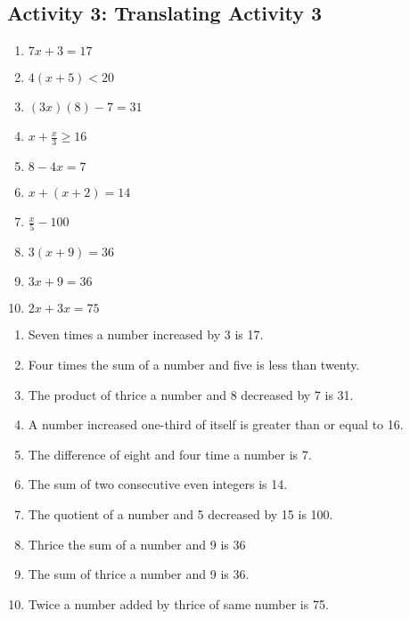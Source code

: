 \subsection*{Activity 3: Translating Activity 3}
\begin{enumerate}
\item $7x +3 = 17$
\item $4(x + 5) < 20$
\item $(3x)(8) - 7 =31$
\item $x+\frac{x}{3}\ge 16$
\item $8 - 4x = 7$
\item $x + (x + 2) = 14$
\item $\frac{x}{5}-100$
\item $3(x + 9) = 36$
\item $3x + 9 = 36$
\item $2x + 3x = 75$
\end{enumerate}
\Answers
\begin{enumerate}
\item Seven times a number increased by 3 is 17.
\item Four times the sum of a number and five is less than twenty.
\item The product of thrice a number and 8 decreased by 7 is 31.
\item A number increased one-third of itself is greater than or equal to 16.
\item The difference of eight and four time a number is 7.
\item The sum of two consecutive even integers is 14.
\item The quotient of a number and 5 decreased by 15 is 100.
\item Thrice the sum of a number and 9 is 36
\item The sum of thrice a number and 9 is 36.
\item Twice a number added by thrice of same number is 75.
\end{enumerate}

